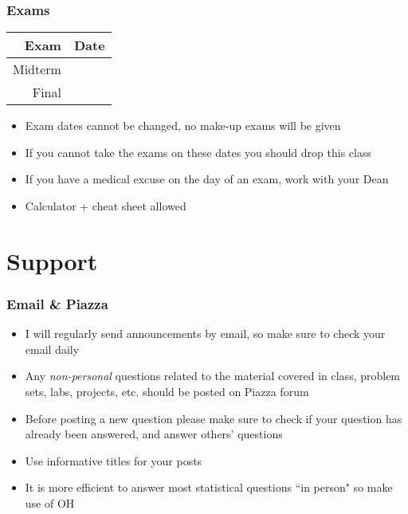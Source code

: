 \documentclass[slidestop,compress,mathserif,12pt,t,professionalfonts,xcolor=table]{beamer}
\begin{document}
\begin{frame}
\frametitle{Exams}

\begin{center}
\renewcommand\arraystretch{1.25}
{\footnotesize
\begin{tabular}{ r | l }
Exam								& Date \\
\hline
Midterm 								& \ExamDate \\    
Final 								& \FinalDate   
\end{tabular}
}
\end{center}

\begin{itemize}

\item Exam dates cannot be changed, no make-up exams will be given

\item If you cannot take the exams on these dates you should drop this class

\item If you have a medical excuse on the day of an exam, work with your Dean

\item Calculator + cheat sheet allowed

\end{itemize}

\end{frame}


\section{Support}


\begin{frame}
\frametitle{Email \& Piazza}

\begin{itemize}

\item I will regularly send announcements by email, so make sure to check your email  daily

\item Any \emph{non-personal} questions related to the material covered in class, problem sets, labs, projects, etc. should be posted on Piazza forum

\item Before posting a new question please make sure to check if your question has already been answered, and answer others' questions

\item Use informative titles for your posts

\item It is more efficient to answer most statistical questions ``in person" so make use of OH

\end{itemize}

\end{frame}
\end{document}
